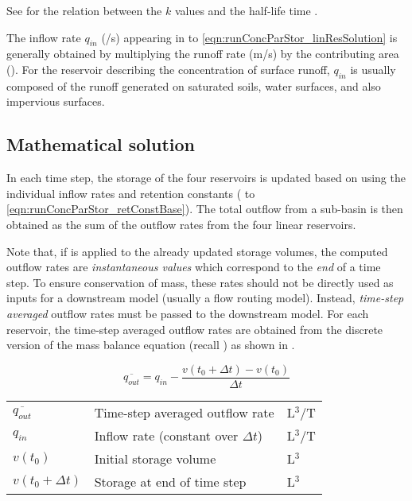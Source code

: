 See  for the relation between the $k$ values and the half-life time \halflife{}.

The inflow rate $q_{in}$ (\cbm/s) appearing in  to \ref{eqn:runConcParStor_linResSolution} is generally obtained by multiplying the runoff rate (m/s) by the contributing area (\sqm). For the reservoir describing the concentration of surface runoff, $q_{in}$ is usually composed of the runoff generated on saturated soils, water surfaces, and also impervious surfaces.


\subsection{Mathematical solution} \label{sec:runConcParStor_solution}

In each time step, the storage of the four reservoirs is updated based on  using the individual inflow rates and retention constants ( to \ref{eqn:runConcParStor_retConstBase}). The total outflow from a sub-basin is then obtained as the sum of the outflow rates from the four linear reservoirs.

Note that, if  is applied to the already updated storage volumes, the computed outflow rates are \emph{instantaneous values} which correspond to the \emph{end} of a time step. To ensure conservation of mass, these rates should not be directly used as inputs for a downstream model (usually a flow routing model). Instead, \emph{time-step averaged} outflow rates must be passed to the downstream model. For each reservoir, the time-step averaged outflow rates are obtained from the discrete version of the mass balance equation (recall ) as shown in .

\begin{equation} \label{eqn:runConcParStor_averageOutflow}
  \overline{q_{out}} = q_{in} - \frac{v(t_0 + \Delta t) - v(t_0)}{\Delta t}
\end{equation}
\medskip
\begin{tabular}{lll}
  $\overline{q_{out}}$ & Time-step averaged outflow rate & L$^3$/T\\
  $q_{in}$ & Inflow rate (constant over $\Delta t$) & L$^3$/T \\
  $v(t_0)$ & Initial storage volume & L$^3$ \\
  $v(t_0 + \Delta t)$ & Storage at end of time step & L$^3$ \\
\end{tabular}

